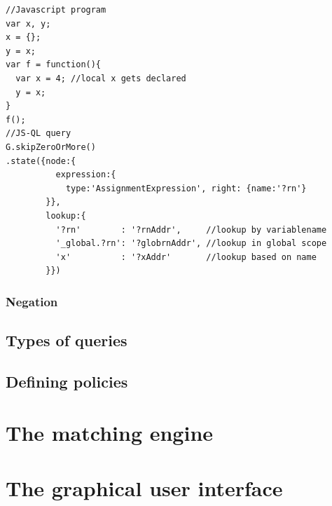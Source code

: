 \begin{lstlisting}[label={lst:lookup},language=JSQL, caption=Looking up addresses in JS-QL,mathescape=true]
//Javascript program
var x, y;
x = {};
y = x;
var f = function(){
  var x = 4; //local x gets declared
  y = x;
}
f();
//JS-QL query
G.skipZeroOrMore()
.state({node:{
          expression:{
            type:'AssignmentExpression', right: {name:'?rn'}
        }},
        lookup:{
          '?rn'        : '?rnAddr',     //lookup by variablename
          '_global.?rn': '?globrnAddr', //lookup in global scope
          'x'          : '?xAddr'       //lookup based on name
        }})
\end{lstlisting}



\subsubsection{Negation}



\subsection{Types of queries}
\label{subsec:TypesOfQueries}
\subsection{Defining policies}
\label{subsec:DefiningPolicies}
\section{The matching engine} 
\label{sec:matchingEngine} %
\section{The graphical user interface} 
\label{sec:GUI}
